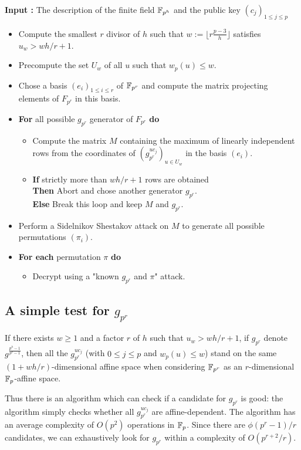 \documentclass[a4paper]{article}
\newcommand{\GF}[1]{\F_{#1}}
\begin{document}
\textbf{Input : } The description of the finite field $\mathbb{F}_{p^h}$ and the public key $(c_j)_{1 \leq j \leq p}$
\begin{itemize}
\item Compute the smallest $r$ divisor of $h$ such that $w := \lfloor r \frac{p-3}{h} \rfloor$ satisfies $u_w > wh/r+1$.

\item Precompute the set $U_w$ of all $u$ such that $w_p(u) \leq w$.
\item Chose a basis $(e_i)_{1 \leq i \leq r}$ of $\mathbb{F}_{p^r}$ and compute the matrix projecting elements of $F_{p^r}$ in this basis.

\item \textbf{For} all possible $g_{p^r}$ generator of $F_{p^r}$ \textbf{do}
\begin{itemize}
\item Compute the matrix $M$ containing the maximum of linearly independent rows from the coordinates of $\left( g_{p^r}^{uc_j} \right)_{u \in U_w}$ in the basis $(e_i)$.

\item \textbf{If } strictly more than $wh/r+1$ rows are obtained\\
\textbf{Then } Abort and chose another generator $g_{p^r}$. \\
\textbf{Else } Break this loop and keep $M$ and $g_{p^r}$.
\end{itemize}
\item Perform a Sidelnikov Shestakov attack on $M$ to generate all possible permutations $(\pi_i)$.
\item \textbf{For each } permutation $\pi$ \textbf{ do }
\begin{itemize}
\item Decrypt using a "known $g_{p^r}$ and $\pi$" attack.
\end{itemize}
\end{itemize}



\subsection{A simple test for $g_{p^r}$}

\begin{theorem}
If there exists $w \geq 1$ and a factor $r$ of $h$ such that $u_w > wh/r + 1$, if $g_{p^r}$ denote $g^{\frac{p^h-1}{p^r-1}}$, then all the $g_{p^r}^{uc_j}$ (with $0 \leq j\leq p$ and $w_p(u) \leq w$) stand on the same $(1+wh/r)$-dimensional affine space when considering $\GF{p^r}$ as an $r$-dimensional $\GF{p}$-affine space.
\end{theorem}
Thus there is an algorithm which can check if a candidate for $g_{p^r}$ is good: the algorithm simply checks whether all $g_{p^r}^{uc_j}$ are affine-dependent. The algorithm has an average complexity of $O(p^2)$ operations in $\GF{p}$. Since there are $\phi(p^r-1)/r$ candidates, we can exhaustively look for $g_{p^r}$ within a complexity of $O(p^{r+2} /r)$.
\end{document}

